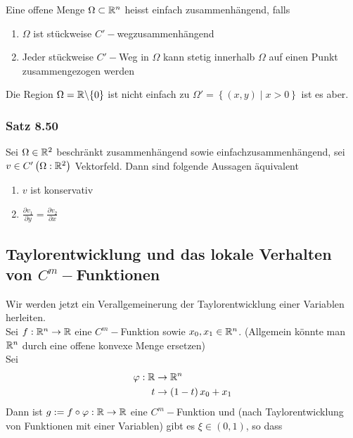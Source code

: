 \begin{definition}{8.49}
Eine offene Menge $\Omega\subset\mathbb{R}^n$ heisst einfach zusammenhängend, falls
\begin{enumerate}
\item $\Omega$ ist stückweise $C'-$wegzusammenhängend
\item Jeder stückweise $C'-$Weg in $\Omega$ kann stetig innerhalb $\Omega$ auf einen Punkt zusammengezogen werden
\end{enumerate}
Die Region $\Omega=\mathbb{R}\backslash\{ 0\}$ ist nicht einfach zu $\Omega' = \left\{ \left( x,y\right) \mid x>0\right\}$ ist es aber.%
\end{definition}

\subsubsection*{Satz 8.50}
Sei $\Omega\in\mathbb{R}^2$ beschränkt zusammenhängend sowie einfachzusammenhängend, sei $v\in C'\left( \Omega:\mathbb{R}^2\right)$ Vektorfeld. Dann sind folgende Aussagen äquivalent
\begin{enumerate}
\item $v$ ist konservativ
\item $\frac{\partial v_1}{\partial y}=\frac{\partial v_2}{\partial x}$
\end{enumerate}

\subsection*{Taylorentwicklung und das lokale Verhalten von $C^m-$Funktionen}
Wir werden jetzt ein Verallgemeinerung der Taylorentwicklung einer Variablen herleiten. \\

Sei $f:\mathbb{R}^n\to\mathbb{R}$ eine $C^m-$Funktion sowie $x_0,x_1\in\mathbb{R}^n$. (Allgemein könnte man $\mathbb{R}^n$ durch eine offene konvexe Menge ersetzen)\\

\noindent Sei
\begin{align*}
\varphi:\mathbb{R} &\to\mathbb{R}^n\\
t & \to \left( 1-t\right) x_0+x_1
\end{align*}
Dann ist $g:=f\circ\varphi:\mathbb{R}\to\mathbb{R}$ eine $C^m-$Funktion und (nach Taylorentwicklung  von Funktionen mit einer Variablen) gibt es $\xi\in (0,1)$, so dass

